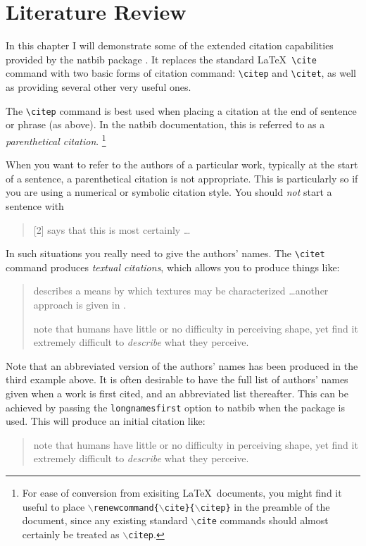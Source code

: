 \chapter{Literature Review}

In this chapter I will demonstrate some of the extended citation
capabilities provided by the {\sf natbib} package \cite{Dal1999}. It
replaces the standard \LaTeX\ \verb+\cite+ command with two basic forms of
citation command: \verb+\citep+ and \verb+\citet+, as well as providing
several other very useful ones.

The \verb+\citep+ command is best used when placing a citation at the end
of sentence or phrase (as above).  In the {\sf natbib} documentation, this
is referred to as a \emph{parenthetical citation}.%
\footnote{For ease of conversion from exisiting \LaTeX\ documents, you
might find it useful to place
\texttt{$\backslash$renewcommand\{$\backslash$cite\}\{$\backslash$citep\}}
in the preamble of the document, since any existing standard
\texttt{$\backslash$cite} commands should almost certainly be treated as
\texttt{$\backslash$citep}.}

When you want to refer to the authors of a particular work, typically at
the start of a sentence, a parenthetical citation is not appropriate. This
is particularly so if you are using a numerical or symbolic citation style.
You should \emph{not} start a sentence with
\begin{quote}
[2] says that this is most certainly \ldots
\end{quote}
In such situations you really need to give the authors' names. The
\verb+\citet+ command produces \emph{textual citations}, which allows you
to produce things like:
\begin{quote}
\citet{Ade1983} describes a means by which textures may be
characterized \ldots another approach is given in \citet{DeV1998}.

\citet{AGR1996} note that humans have little or no difficulty in
perceiving shape, yet find it extremely difficult to \emph{describe} what
they perceive.
\end{quote}

Note that an abbreviated version of the authors' names has been produced in
the third example above.  It is often desirable to have the full list of
authors' names given when a work  is first cited, and an abbreviated list
thereafter. This can be achieved by passing the \texttt{longnamesfirst}
option to {\sf natbib} when the package is used. This will produce
an initial citation like:
\begin{quote}
\citet*{AGR1996} note that humans have little or no difficulty in
perceiving shape, yet find it extremely difficult to \emph{describe} what
they perceive.
\end{quote}

